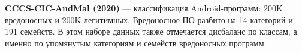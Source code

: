 \textbf{CCCS-CIC-AndMal (2020)} — классификация Android-программ: 200K вредоносных и 200K легитимных. Вредоносное ПО разбито на 14 категорий и 191 семейств. В этом наборе данных также отмечается дисбаланс по классам, а именно по упомянутым категориям и семейств вредоносных программ.

